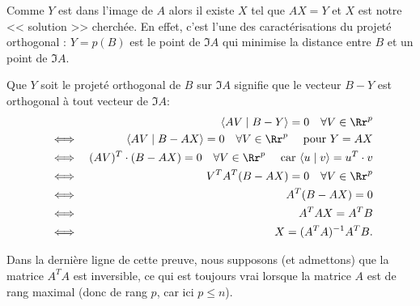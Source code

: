 \documentclass[class=report,crop=false]{standalone}
\begin{document}

Comme $Y$ est dans l'image de $A$ alors il existe $X$ tel que
$AX=Y$ et $X$ est notre << solution >> cherchée.
En effet, c'est l'une des caractérisations du projeté orthogonal : 
$Y = p(B)$ est le point de $\Im A$ qui minimise la distance entre $B$ et un 
point de $\Im A$. 
  
  
  Que $Y$ soit le projeté orthogonal de $B$ sur $\Im A$ signifie
  que le vecteur $B-Y$ est orthogonal à tout vecteur de $\Im A$:
  \begin{eqnarray*}
    && \langle AV \mid B-Y \rangle = 0 \quad \forall V \in \Rr^p \\
    & \iff & \langle AV \mid B-AX \rangle = 0 \quad \forall V \in \Rr^p \quad \text{ pour } Y=AX\\
    & \iff & (AV)^T \cdot (B-AX)= 0 \quad \forall V \in \Rr^p \quad \text{ car } \langle u \mid v\rangle = u^T\cdot v\\
    & \iff & V^T  A^T (B-AX)= 0 \quad \forall V \in \Rr^p \\    
    & \iff & A^T (B-AX)= 0 \\
    & \iff & A^TAX= A^T B \\
    & \iff & X = (A^TA)^{-1} A^TB. \\    
  \end{eqnarray*} 



  
\begin{remarque*}
  Dans la dernière ligne de cette preuve, nous supposons (et admettons) que la matrice $A^TA$ est 
  inversible, ce qui est toujours vrai lorsque la matrice $A$ est de rang maximal (donc de rang $p$, 
  car ici $p \le n$).

\end{remarque*}

\finchapitre
\end{document}
